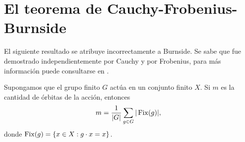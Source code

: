 \chapter{El teorema de Cauchy-Frobenius-Burnside}

El siguiente resultado se atribuye incorrectamente a Burnside. Se sabe que fue
demostrado independientemente por Cauchy y por Frobenius, para más información
puede consultarse en \cite{MR562002}.
    
\begin{theorem}
    Supongamos que el grupo finito $G$ actúa en un conjunto finito $X$. 
    Si $m$ es la cantidad de órbitas de la acción,
    entonces
    \[
    m=\frac{1}{|G|}\sum_{g\in G}|\operatorname{Fix}(g)|,
    \]
    donde $\operatorname{Fix}(g)=\{x\in X:g\cdot x=x\}$.
\end{theorem}
    
